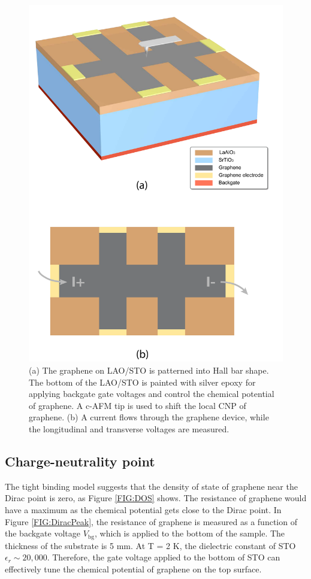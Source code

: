 \documentclass[pdflatex, sectionletters, 12pt]{pittetd}    %
\begin{document}
\begin{figure}[p]
	\centering
	\includegraphics[width=.7\textwidth]{Drawing/HallDevice.pdf}
	\caption{(a) The graphene on LAO/STO is patterned into Hall bar shape. The bottom of the LAO/STO is painted with silver epoxy for applying backgate gate voltages and control the chemical potential of graphene. A c-AFM tip is used to shift the local CNP of graphene. (b) A current flows through the graphene device, while the longitudinal and transverse voltages are measured.}
	\label{FIG:HallDevice}
\end{figure}

\subsection{Charge-neutrality point}

The tight binding model suggests that the density of state of graphene near the Dirac point is zero\cite{neto2009electronic}, as Figure \ref{FIG:DOS} shows. The resistance of graphene would have a maximum as the chemical potential gets close to the Dirac point. In Figure \ref{FIG:DiracPeak}, the resistance of graphene is measured as a function of the backgate voltage $V_\mathrm{bg}$, which is applied to the bottom of the sample. The thickness of the substrate is 5 mm. At T = 2 K, the dielectric constant of STO $\epsilon_r \sim 20,000$. Therefore, the gate voltage applied to the bottom of STO can effectively tune the chemical potential of graphene on the top surface. 
\\
\end{document}
